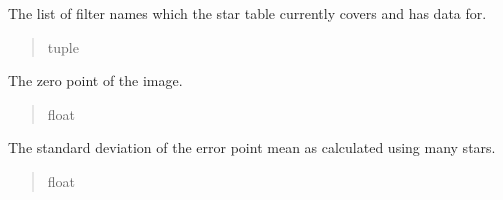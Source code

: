 \documentclass[letterpaper,11pt,english]{sphinxmanual}
\begin{document}
\begin{savenotes}
\begin{fulllineitems}
\begin{savenotes}\begin{fulllineitems}
\label{\detokenize{code/opihiexarata.photometry.solution:opihiexarata.photometry.solution.PhotometricSolution.available_filters}}
\pysigstartsignatures
{}
\pysigstopsignatures
\sphinxAtStartPar
The list of filter names which the star table currently covers and has
data for.
\begin{quote}\begin{description}
\sphinxAtStartPar
tuple

\end{description}\end{quote}

\end{fulllineitems}\end{savenotes}


\begin{savenotes}\begin{fulllineitems}
\label{\detokenize{code/opihiexarata.photometry.solution:opihiexarata.photometry.solution.PhotometricSolution.zero_point}}
\pysigstartsignatures
{}
\pysigstopsignatures
\sphinxAtStartPar
The zero point of the image.
\begin{quote}\begin{description}
\sphinxAtStartPar
float

\end{description}\end{quote}

\end{fulllineitems}\end{savenotes}


\begin{savenotes}\begin{fulllineitems}
\label{\detokenize{code/opihiexarata.photometry.solution:opihiexarata.photometry.solution.PhotometricSolution.zero_point_error}}
\pysigstartsignatures
{}
\pysigstopsignatures
\sphinxAtStartPar
The standard deviation of the error point mean as calculated using
many stars.
\begin{quote}\begin{description}
\sphinxAtStartPar
float


\end{description}
\end{quote}
\end{fulllineitems}
\end{savenotes}
\end{fulllineitems}
\end{savenotes}
\end{document}
